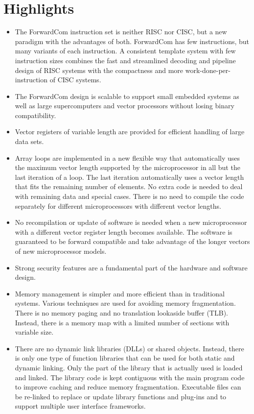 \documentclass[forwardcom.tex]{subfiles}
\begin{document}
\section{Highlights}
\begin{itemize}
\item The ForwardCom instruction set is neither RISC nor CISC, but a new paradigm with the advantages of both. ForwardCom has few instructions, but many variants of each instruction. A consistent template system with few instruction sizes combines the fast and streamlined decoding and pipeline design of RISC systems with the compactness and more work-done-per-instruction of CISC systems. 

\item The ForwardCom design is scalable to support small embedded systems as well as large supercomputers and vector processors without losing binary compatibility.

\item Vector registers of variable length are provided for efficient handling of large data sets.

\item Array loops are implemented  in a new flexible way that automatically uses the maximum vector length supported by the microprocessor in all but the last iteration of a loop. The last iteration automatically uses a vector length that fits the remaining number of elements. No extra code is needed to deal with remaining data and special cases. There is no need to compile the code separately for different microprocessors with different vector lengths.

\item No recompilation or update of software is needed when a new microprocessor with a different vector register length becomes available. The software is guaranteed to be forward compatible and take advantage of the longer vectors
of new microprocessor models.

\item Strong security features are a fundamental part of the hardware and software design.

\item Memory management is simpler and more efficient than in traditional systems. 
Various techniques are used for avoiding memory 
fragmentation. There is no memory paging and no translation lookaside buffer (TLB). Instead, there is a memory map with a limited number of sections with variable size.

\item There are no dynamic link libraries (DLLs) or shared objects. Instead, there is only one type of function libraries 
that can be used for both static and dynamic linking. Only the part of the library that is actually used is loaded and linked. The library code is kept contiguous with the main program code to improve caching and reduce memory fragmentation. 
Executable files can be re-linked to replace or update library functions and plug-ins and to support multiple user interface frameworks.


\end{itemize}
\end{document}
